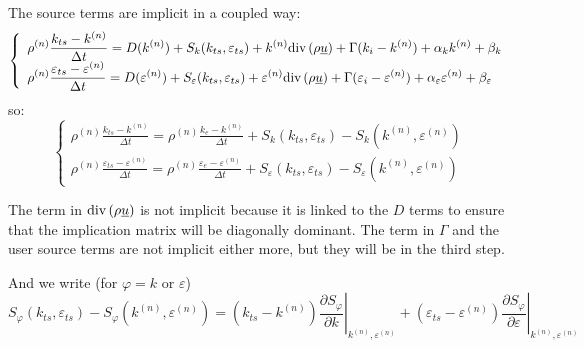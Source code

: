 
The source terms are implicit in a coupled way:
\begin{equation}
\left\{\begin{array}{l}
\displaystyle
\rho^{(n)}\frac{k_{ts}-k^{(n)}}{\Delta t} =
D(k^{(n)}) + S_k(k_{ts},\varepsilon_{ts})
+k^{(n)}\text{div}\,(\rho\underline{u})+\Gamma(k_i-k^{(n)})+\alpha_k k^{(n)} +\beta_k\\
\displaystyle
\rho^{(n)}\frac{\varepsilon_{ts}-\varepsilon^{(n)}}{\Delta t}  =
D(\varepsilon^{(n)}) + S_\varepsilon(k_{ts},\varepsilon_{ts})
+\varepsilon^{(n)}\text{div}\,(\rho\underline{u})
+\Gamma(\varepsilon_i-\varepsilon^{(n)})
+\alpha_\varepsilon \varepsilon^{(n)} +\beta_\varepsilon
\end{array}\right.
\end{equation}
so:
\begin{equation}
\left\{\begin{array}{l}
\displaystyle
\rho^{(n)}\frac{k_{ts}-k^{(n)}}{\Delta t} =
\rho^{(n)}\frac{k_e-k^{(n)}}{\Delta t}
+S_k(k_{ts},\varepsilon_{ts})-S_k(k^{(n)},\varepsilon^{(n)})\\
\displaystyle
\rho^{(n)}\frac{\varepsilon_{ts}-\varepsilon^{(n)}}{\Delta t}  =
\rho^{(n)}\frac{\varepsilon_e-\varepsilon^{(n)}}{\Delta t}
+S_\varepsilon(k_{ts},\varepsilon_{ts})-S_\varepsilon(k^{(n)},\varepsilon^{(n)})
\end{array}\right.
\end{equation}

The term in $\text{div}\,(\rho\underline{u})$ is not  implicit because it is linked to the
$D$ terms to ensure that the implication matrix
will be diagonally dominant. The term in $\Gamma$ and the user source
terms are not implicit either more, but they will be in the third step.

And we write (for $\varphi=k$ or $\varepsilon$)
\begin{equation}
S_\varphi(k_{ts},\varepsilon_{ts})-S_\varphi(k^{(n)},\varepsilon^{(n)})
=(k_{ts}-k^{(n)})
\left.\frac{\partial S_\varphi}{\partial k}\right|_{k^{(n)},\varepsilon^{(n)}}
+(\varepsilon_{ts}-\varepsilon^{(n)})
\left.\frac{\partial S_\varphi}{\partial \varepsilon}\right|_{k^{(n)},\varepsilon^{(n)}}
\end{equation}

